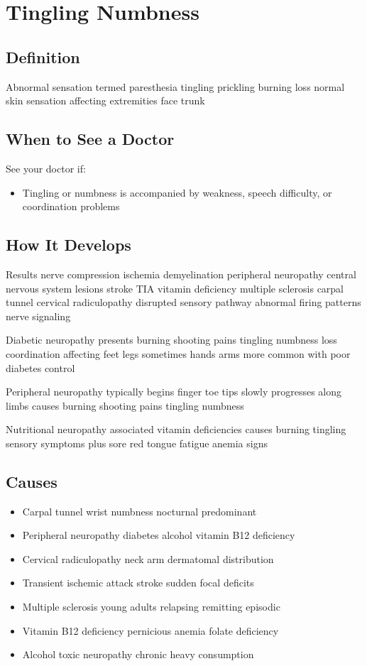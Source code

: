 \chapter{Tingling Numbness}

\section*{Definition}
Abnormal sensation termed paresthesia tingling prickling burning loss normal skin sensation affecting extremities face trunk

\section*{When to See a Doctor}
See your doctor if:
\begin{itemize}
  \item Tingling or numbness is accompanied by weakness, speech difficulty, or coordination problems
\end{itemize}

\section*{How It Develops}
Results nerve compression ischemia demyelination peripheral neuropathy central nervous system lesions stroke TIA vitamin deficiency multiple sclerosis carpal tunnel cervical radiculopathy disrupted sensory pathway abnormal firing patterns nerve signaling

Diabetic neuropathy presents burning shooting pains tingling numbness loss coordination affecting feet legs sometimes hands arms more common with poor diabetes control

Peripheral neuropathy typically begins finger toe tips slowly progresses along limbs causes burning shooting pains tingling numbness

Nutritional neuropathy associated vitamin deficiencies causes burning tingling sensory symptoms plus sore red tongue fatigue anemia signs

\section*{Causes}
\begin{itemize}
  \item Carpal tunnel wrist numbness nocturnal predominant
  \item Peripheral neuropathy diabetes alcohol vitamin B12 deficiency
  \item Cervical radiculopathy neck arm dermatomal distribution
  \item Transient ischemic attack stroke sudden focal deficits
  \item Multiple sclerosis young adults relapsing remitting episodic
  \item Vitamin B12 deficiency pernicious anemia folate deficiency
  \item Alcohol toxic neuropathy chronic heavy consumption
\end{itemize}

